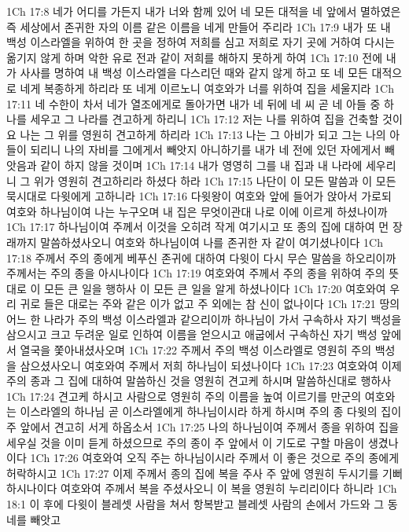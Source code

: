 1Ch 17:8  네가 어디를 가든지 내가 너와 함께 있어 네 모든 대적을 네 앞에서 멸하였은즉 세상에서 존귀한 자의 이름 같은 이름을 네게 만들어 주리라
1Ch 17:9  내가 또 내 백성 이스라엘을 위하여 한 곳을 정하여 저희를 심고 저희로 자기 곳에 거하여 다시는 옮기지 않게 하며 악한 유로 전과 같이 저희를 해하지 못하게 하여
1Ch 17:10  전에 내가 사사를 명하여 내 백성 이스라엘을 다스리던 때와 같지 않게 하고 또 네 모든 대적으로 네게 복종하게 하리라 또 네게 이르노니 여호와가 너를 위하여 집을 세울지라
1Ch 17:11  네 수한이 차서 네가 열조에게로 돌아가면 내가 네 뒤에 네 씨 곧 네 아들 중 하나를 세우고 그 나라를 견고하게 하리니
1Ch 17:12  저는 나를 위하여 집을 건축할 것이요 나는 그 위를 영원히 견고하게 하리라
1Ch 17:13  나는 그 아비가 되고 그는 나의 아들이 되리니 나의 자비를 그에게서 빼앗지 아니하기를 내가 네 전에 있던 자에게서 빼앗음과 같이 하지 않을 것이며
1Ch 17:14  내가 영영히 그를 내 집과 내 나라에 세우리니 그 위가 영원히 견고하리라 하셨다 하라
1Ch 17:15  나단이 이 모든 말씀과 이 모든 묵시대로 다윗에게 고하니라
1Ch 17:16  다윗왕이 여호와 앞에 들어가 앉아서 가로되 여호와 하나님이여 나는 누구오며 내 집은 무엇이관대 나로 이에 이르게 하셨나이까
1Ch 17:17  하나님이여 주께서 이것을 오히려 작게 여기시고 또 종의 집에 대하여 먼 장래까지 말씀하셨사오니 여호와 하나님이여 나를 존귀한 자 같이 여기셨나이다
1Ch 17:18  주께서 주의 종에게 베푸신 존귀에 대하여 다윗이 다시 무슨 말씀을 하오리이까 주께서는 주의 종을 아시나이다
1Ch 17:19  여호와여 주께서 주의 종을 위하여 주의 뜻대로 이 모든 큰 일을 행하사 이 모든 큰 일을 알게 하셨나이다
1Ch 17:20  여호와여 우리 귀로 들은 대로는 주와 같은 이가 없고 주 외에는 참 신이 없나이다
1Ch 17:21  땅의 어느 한 나라가 주의 백성 이스라엘과 같으리이까 하나님이 가서 구속하사 자기 백성을 삼으시고 크고 두려운 일로 인하여 이름을 얻으시고 애굽에서 구속하신 자기 백성 앞에서 열국을 쫓아내셨사오며
1Ch 17:22  주께서 주의 백성 이스라엘로 영원히 주의 백성을 삼으셨사오니 여호와여 주께서 저희 하나님이 되셨나이다
1Ch 17:23  여호와여 이제 주의 종과 그 집에 대하여 말씀하신 것을 영원히 견고케 하시며 말씀하신대로 행하사
1Ch 17:24  견고케 하시고 사람으로 영원히 주의 이름을 높여 이르기를 만군의 여호와는 이스라엘의 하나님 곧 이스라엘에게 하나님이시라 하게 하시며 주의 종 다윗의 집이 주 앞에서 견고히 서게 하옵소서
1Ch 17:25  나의 하나님이여 주께서 종을 위하여 집을 세우실 것을 이미 듣게 하셨으므로 주의 종이 주 앞에서 이 기도로 구할 마음이 생겼나이다
1Ch 17:26  여호와여 오직 주는 하나님이시라 주께서 이 좋은 것으로 주의 종에게 허락하시고
1Ch 17:27  이제 주께서 종의 집에 복을 주사 주 앞에 영원히 두시기를 기뻐하시나이다 여호와여 주께서 복을 주셨사오니 이 복을 영원히 누리리이다 하니라
1Ch 18:1  이 후에 다윗이 블레셋 사람을 쳐서 항복받고 블레셋 사람의 손에서 가드와 그 동네를 빼앗고
